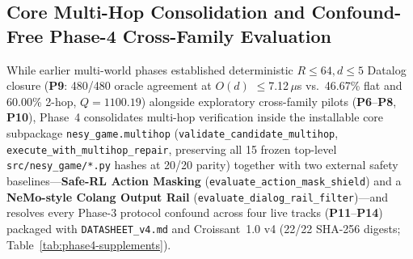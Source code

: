 \subsection{Core Multi-Hop Consolidation and Confound-Free Phase-4 Cross-Family Evaluation}\label{sec:phase4-supplements}
While earlier multi-world phases established deterministic $R{\le}64, d{\le}5$ Datalog closure (\textbf{P9}: 480/480 oracle agreement at $O(d)$ $\le$7.12\,$\mu$s vs.\ 46.67\% flat and 60.00\% 2-hop, $Q{=}1100.19$) alongside exploratory cross-family pilots (\textbf{P6}--\textbf{P8}, \textbf{P10}), Phase~4 consolidates multi-hop verification inside the installable core subpackage \texttt{nesy\_\allowbreak game.\allowbreak multihop} (\texttt{validate\_\allowbreak candidate\_\allowbreak multihop}, \texttt{execute\_\allowbreak with\_\allowbreak multihop\_\allowbreak repair}, preserving all 15 frozen top-level \texttt{src/\allowbreak nesy\_\allowbreak game/*.py} hashes at 20/20 parity) together with two external safety baselines---\textbf{Safe-RL Action Masking} (\texttt{evaluate\_\allowbreak action\_\allowbreak mask\_\allowbreak shield}) and a \textbf{NeMo-style Colang Output Rail} (\texttt{evaluate\_\allowbreak dialog\_\allowbreak rail\_\allowbreak filter})---and resolves every Phase-3 protocol confound across four live tracks (\textbf{P11}--\textbf{P14}) packaged with \texttt{DATASHEET\_v4.md} and Croissant~1.0 v4 (22/22 SHA-256 digests; Table~\ref{tab:phase4-supplements}).

